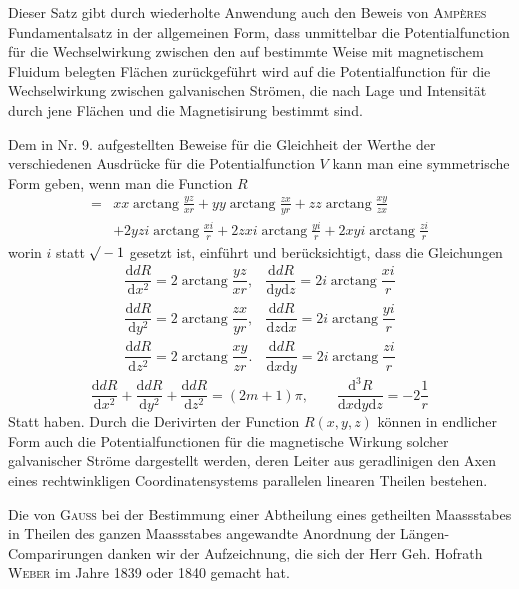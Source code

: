
Dieser Satz gibt durch wiederholte Anwendung auch den Beweis von \textsc{Ampères} Fundamentalsatz in der allgemeinen Form, dass unmittelbar die Potentialfunction für die Wechselwirkung zwischen den auf bestimmte Weise mit magnetischem Fluidum belegten Flächen zurückgeführt wird auf die Potentialfunction für die Wechselwirkung zwischen galvanischen Strömen, die nach Lage und Intensität durch jene Flächen und die Magnetisirung bestimmt sind.

Dem in Nr. 9. aufgestellten Beweise für die Gleichheit der Werthe der verschiedenen Ausdrücke für die Potentialfunction $V$ kann man eine symmetrische Form geben, wenn man die Function $R$
\[
\begin{aligned}
={}&xx\operatorname{arctang}\frac{yz}{xr}+yy\operatorname{arctang}\frac{zx}{yr}+zz\operatorname{arctang}\frac{xy}{zx}\\
&+2yzi\operatorname{arctang}\frac{xi}r+2zxi\operatorname{arctang}\frac{yi}r+2xyi\operatorname{arctang}\frac{zi}r
\end{aligned}
\]
worin $i$ statt $\mathord{{}^{}\!\surd}-1$ gesetzt ist, einführt und berücksichtigt, dass die Gleichungen
\[
\begin{array}{ll}
\dfrac{\mathrm ddR}{\mathrm dx^2}=2\operatorname{arctang}\dfrac{yz}{xr},&\dfrac{\mathrm ddR}{\mathrm dy\mathrm dz}=2i\operatorname{arctang}\dfrac{xi}r\\[5pt]
\dfrac{\mathrm ddR}{\mathrm dy^2}=2\operatorname{arctang}\dfrac{zx}{yr},&\dfrac{\mathrm ddR}{\mathrm dz\mathrm dx}=2i\operatorname{arctang}\dfrac{yi}r\\[5pt]
\dfrac{\mathrm ddR}{\mathrm dz^2}=2\operatorname{arctang}\dfrac{xy}{zr}.&\dfrac{\mathrm ddR}{\mathrm dx\mathrm dy}=2i\operatorname{arctang}\dfrac{zi}r
\end{array}
\]
\[
\frac{\mathrm ddR}{\mathrm dx^2}+\frac{\mathrm ddR}{\mathrm dy^2}+\frac{\mathrm ddR}{\mathrm dz^2}=(2m+1)\pi,\qquad\frac{\mathrm d^3R}{\mathrm dx\mathrm dy\mathrm dz}=-2\frac1r
\]
Statt haben. Durch die Derivirten der Function $R(x,y,z)$ können in endlicher Form auch die Potentialfunctionen für die magnetische Wirkung solcher galvanischer Ströme dargestellt werden, deren Leiter aus geradlinigen den Axen eines rechtwinkligen Coordinatensystems parallelen linearen Theilen bestehen.

Die von \textsc{Gauss} bei der Bestimmung einer Abtheilung eines getheilten Maassstabes in Theilen des ganzen Maassstabes angewandte Anordnung der Längen-Comparirungen danken wir der Aufzeichnung, die sich der Herr Geh. Hofrath \textsc{Weber} im Jahre 1839 oder 1840 gemacht hat.

